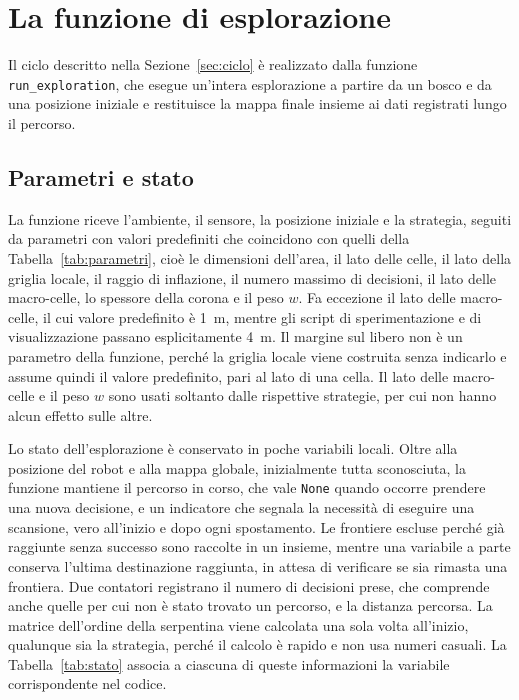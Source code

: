 \section{La funzione di esplorazione}
\label{sec:esplorazione}

Il ciclo descritto nella Sezione~\ref{sec:ciclo} è realizzato dalla funzione \texttt{run\_exploration}, che esegue un'intera esplorazione a partire da un bosco e da una posizione iniziale e restituisce la mappa finale insieme ai dati registrati lungo il percorso.

\subsection{Parametri e stato}
\label{sec:parametri_stato}

La funzione riceve l'ambiente, il sensore, la posizione iniziale e la strategia, seguiti da parametri con valori predefiniti che coincidono con quelli della Tabella~\ref{tab:parametri}, cioè le dimensioni dell'area, il lato delle celle, il lato della griglia locale, il raggio di inflazione, il numero massimo di decisioni, il lato delle macro-celle, lo spessore della corona e il peso $w$. Fa eccezione il lato delle macro-celle, il cui valore predefinito è 1~m, mentre gli script di sperimentazione e di visualizzazione passano esplicitamente 4~m. Il margine sul libero non è un parametro della funzione, perché la griglia locale viene costruita senza indicarlo e assume quindi il valore predefinito, pari al lato di una cella. Il lato delle macro-celle e il peso $w$ sono usati soltanto dalle rispettive strategie, per cui non hanno alcun effetto sulle altre.

Lo stato dell'esplorazione è conservato in poche variabili locali. Oltre alla posizione del robot e alla mappa globale, inizialmente tutta sconosciuta, la funzione mantiene il percorso in corso, che vale \texttt{None} quando occorre prendere una nuova decisione, e un indicatore che segnala la necessità di eseguire una scansione, vero all'inizio e dopo ogni spostamento. Le frontiere escluse perché già raggiunte senza successo sono raccolte in un insieme, mentre una variabile a parte conserva l'ultima destinazione raggiunta, in attesa di verificare se sia rimasta una frontiera. Due contatori registrano il numero di decisioni prese, che comprende anche quelle per cui non è stato trovato un percorso, e la distanza percorsa. La matrice dell'ordine della serpentina viene calcolata una sola volta all'inizio, qualunque sia la strategia, perché il calcolo è rapido e non usa numeri casuali. La Tabella~\ref{tab:stato} associa a ciascuna di queste informazioni la variabile corrispondente nel codice.

